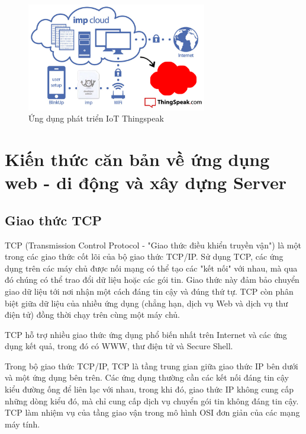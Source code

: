 \begin{figure}[H] 
\centering    
\includegraphics[width=0.7\textwidth]{thingspeak}
\caption[Ứng dụng phát triển IoT Thingspeak]{Ứng dụng phát triển IoT Thingspeak}
\label{fig:thingspeak}
\end{figure}

\section{Kiến thức căn bản về ứng dụng web - di động và xây dựng Server}

\subsection{Giao thức TCP}
TCP (Transmission Control Protocol - "Giao thức điều khiển truyền vận") là một trong các giao thức cốt lõi của bộ giao thức TCP/IP. Sử dụng TCP, các ứng dụng trên các máy chủ được nối mạng có thể tạo các "kết nối" với nhau, mà qua đó chúng có thể trao đổi dữ liệu hoặc các gói tin. Giao thức này đảm bảo chuyển giao dữ liệu tới nơi nhận một cách đáng tin cậy và đúng thứ tự. TCP còn phân biệt giữa dữ liệu của nhiều ứng dụng (chẳng hạn, dịch vụ Web và dịch vụ thư điện tử) đồng thời chạy trên cùng một máy chủ.\cite{c2tcp}

TCP hỗ trợ nhiều giao thức ứng dụng phổ biến nhất trên Internet và các ứng dụng kết quả, trong đó có WWW, thư điện tử và Secure Shell.

Trong bộ giao thức TCP/IP, TCP là tầng trung gian giữa giao thức IP bên dưới và một ứng dụng bên trên. Các ứng dụng thường cần các kết nối đáng tin cậy kiểu đường ống để liên lạc với nhau, trong khi đó, giao thức IP không cung cấp những dòng kiểu đó, mà chỉ cung cấp dịch vụ chuyển gói tin không đáng tin cậy. TCP làm nhiệm vụ của tầng giao vận trong mô hình OSI đơn giản của các mạng máy tính.

